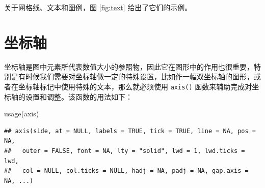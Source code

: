 \documentclass[
  b5paper,
  UTF8,twoside]{book}
\newenvironment{Shaded}{\begin{snugshade}}{\end{snugshade}}
\newcommand{\FunctionTok}[1]{\textcolor[rgb]{0.00,0.00,0.00}{#1}}
\newcommand{\NormalTok}[1]{#1}
\begin{document}
关于网格线、文本和图例，图 \ref{fig:text} 给出了它们的示例。

\hypertarget{sec:axis}{%
\section{坐标轴}\label{sec:axis}}

坐标轴是图中元素所代表数值大小的参照物，因此它在图形中的作用也很重要，特别是有时候我们需要对坐标轴做一定的特殊设置，比如作一幅双坐标轴的图形，或者在坐标轴标记中使用特殊的文本，那么就必须使用 \texttt{axis()} 函数来辅助完成对坐标轴的设置和调整。该函数的用法如下：

\begin{Shaded}
\begin{Highlighting}[]
\FunctionTok{usage}\NormalTok{(axis)}
\end{Highlighting}
\end{Shaded}

\begin{verbatim}
## axis(side, at = NULL, labels = TRUE, tick = TRUE, line = NA, pos = NA,
##   outer = FALSE, font = NA, lty = "solid", lwd = 1, lwd.ticks = lwd,
##   col = NULL, col.ticks = NULL, hadj = NA, padj = NA, gap.axis = NA, ...)
\end{verbatim}
\end{document}
